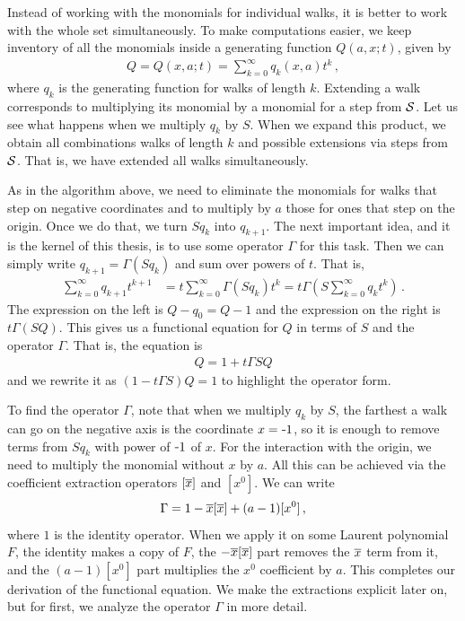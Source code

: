 Instead of working with the monomials for individual walks, it is better to work with the whole set simultaneously. To make computations easier, we keep inventory of all the monomials inside a generating function $Q(a,x;t)$, given by
\begin{align}
	Q = Q(x, a;t) = \sum_{k=0}^{\infty} q_k(x, a)t^k\,,
\end{align}
where $q_k$ is the generating function for walks of length $k$. Extending a walk corresponds to multiplying its monomial by a monomial for a step from $\mathcal{S}$. Let us see what happens when we multiply $q_k$ by $S$. When we expand this product, we obtain all combinations walks of length $k$ and possible extensions via steps from $\mathcal{S}$. That is, we have extended all walks simultaneously. 

As in the algorithm above, we need to eliminate the monomials for walks that step on negative coordinates and to multiply by $a$ those for ones that step on the origin. Once we do that, we turn $Sq_k$ into $q_{k+1}$. The next important idea, and it is the kernel of this thesis, is to use some operator $\Gamma$ for this task. Then we can simply write $q_{k+1} = \Gamma(Sq_k)$ and sum over powers of $t$. That is,
\begin{align}
	\sum_{k=0}^\infty q_{k + 1}t^{k + 1} &= t\sum_{k=0}^\infty\Gamma (Sq_k)t^k = t\Gamma \left(S\sum_{k=0}^{\infty}q_kt^k\right)\,.
\end{align}
The expression on the left is $Q - q_0 = Q - 1$ and the expression on the right is $t\Gamma(SQ)$. This gives us a functional equation for $Q$ in terms of $S$ and the operator $\Gamma$. That is, the equation is
\begin{align}
	Q = 1 + t\Gamma SQ
\end{align}
and we rewrite it as $(1-t\Gamma S)Q = 1$ to highlight the operator form.

To find the operator $\Gamma$, note that when we multiply $q_k$ by $S$, the farthest a walk can go on the negative axis is the coordinate $x = \um 1$, so it is enough to remove terms from $Sq_k$ with power of $\um 1$ of $x$. For the interaction with the origin, we need to multiply the monomial without $x$ by $a$. All this can be achieved via the coefficient extraction operators $[\overline{x}]$ and $[x^0]$. We can write
\begin{align}
	\Gamma = 1 - \overline{x} [\overline{x}] + (a-1)[x^0]\,,
\end{align}
where $1$ is the identity operator. When we apply it on some Laurent polynomial $F$, the identity makes a copy of $F$, the $-\overline{x}[\overline{x}]$ part removes the $\overline{x}$ term from it, and the $(a-1)[x^0]$ part multiplies the $x^0$ coefficient by $a$. This completes our derivation of the functional equation. We make the extractions explicit later on, but for first, we analyze the operator $\Gamma$ in more detail.

